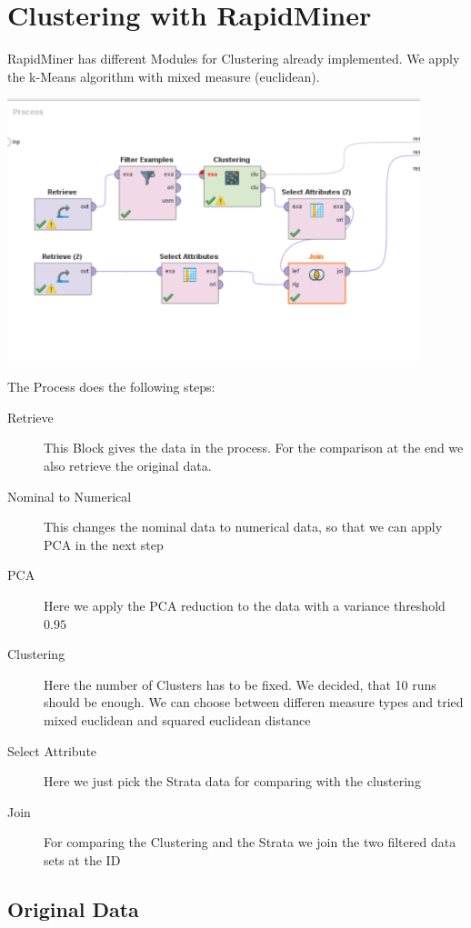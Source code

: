 \section{Clustering with RapidMiner}

RapidMiner has different Modules for Clustering already implemented. We apply the k-Means algorithm with mixed measure (euclidean).

\includegraphics[width=0.9\textwidth]{ClusteringRapid.PNG}


The Process does the following steps:
\begin{description}
	\item[Retrieve] This Block gives the data in the process. For the comparison at the end we also retrieve the original data.
	\item[Nominal to Numerical] This changes the nominal data to numerical data, so that we can apply PCA in the next step
	\item[PCA] Here we apply the PCA reduction to the data with a variance threshold $0.95$
	\item[Clustering] Here the number of Clusters has to be fixed. We decided, that 10 runs should be enough. We can choose between differen measure types and tried mixed euclidean and squared euclidean distance
	\item[Select Attribute] Here we just pick the Strata data for comparing with the clustering
	\item[Join] For comparing the Clustering and the Strata we join the two filtered data sets at the ID
\end{description}

\subsection{Original Data}

